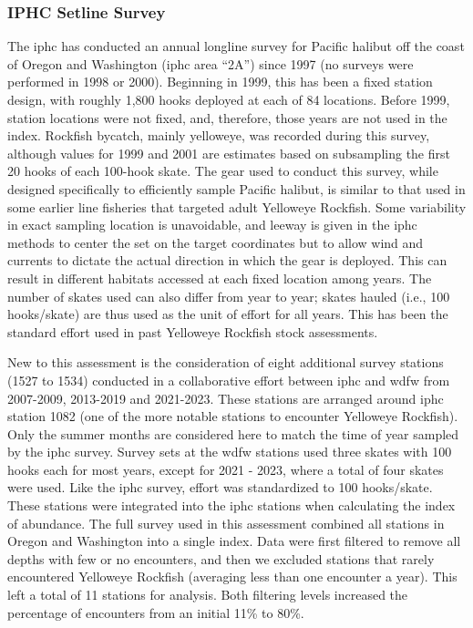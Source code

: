 \documentclass[
]{scrartcl}
\begin{document}
\subsubsection{IPHC Setline Survey}\label{iphc-setline-survey}

The \gls{iphc} has conducted an annual longline survey for Pacific
halibut off the coast of Oregon and Washington (\gls{iphc} area ``2A'')
since 1997 (no surveys were performed in 1998 or 2000). Beginning in
1999, this has been a fixed station design, with roughly 1,800 hooks
deployed at each of 84 locations. Before 1999, station locations were
not fixed, and, therefore, those years are not used in the index.
Rockfish bycatch, mainly yelloweye, was recorded during this survey,
although values for 1999 and 2001 are estimates based on subsampling the
first 20 hooks of each 100-hook skate. The gear used to conduct this
survey, while designed specifically to efficiently sample Pacific
halibut, is similar to that used in some earlier line fisheries that
targeted adult Yelloweye Rockfish. Some variability in exact sampling
location is unavoidable, and leeway is given in the \gls{iphc} methods
to center the set on the target coordinates but to allow wind and
currents to dictate the actual direction in which the gear is deployed.
This can result in different habitats accessed at each fixed location
among years. The number of skates used can also differ from year to
year; skates hauled (i.e., 100 hooks/skate) are thus used as the unit of
effort for all years. This has been the standard effort used in past
Yelloweye Rockfish stock assessments.

New to this assessment is the consideration of eight additional survey
stations (1527 to 1534) conducted in a collaborative effort between
\gls{iphc} and \gls{wdfw} from 2007-2009, 2013-2019 and 2021-2023. These
stations are arranged around \gls{iphc} station 1082 (one of the more
notable stations to encounter Yelloweye Rockfish). Only the summer
months are considered here to match the time of year sampled by the
\gls{iphc} survey. Survey sets at the \gls{wdfw} stations used three
skates with 100 hooks each for most years, except for 2021 - 2023, where
a total of four skates were used. Like the \gls{iphc} survey, effort was
standardized to 100 hooks/skate. These stations were integrated into the
\gls{iphc} stations when calculating the index of abundance. The full
survey used in this assessment combined all stations in Oregon and
Washington into a single index. Data were first filtered to remove all
depths with few or no encounters, and then we excluded stations that
rarely encountered Yelloweye Rockfish (averaging less than one encounter
a year). This left a total of 11 stations for analysis. Both filtering
levels increased the percentage of encounters from an initial 11\% to
80\%.
\end{document}
